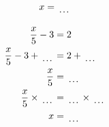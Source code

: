 \documentclass[12pt]{article}
\newcounter{minipagecount}
\begin{document}
\begin{multicols}{2}
\begin{minipage}[t]{0.45\textwidth}
\begin{align*}
        x &= \dotuline{\hspace{5mm}}\\
    \end{align*}
\end{minipage}\columnbreak
\noindent{(\theminipagecount)}\hspace{0.1mm} %
\begin{minipage}[t]{0.45\textwidth} %
    \vspace{-26pt}  %
    \raggedright %
    \begin{align*} %
        \frac{x}{5} - 3 &= 2\\
        \frac{x}{5} - 3 + \dotuline{\hspace{5mm}} &= 2 + \dotuline{\hspace{5mm}}\\
        \frac{x}{5} &= \dotuline{\hspace{5mm}}\\
        \frac{x}{5} \times\dotuline{\hspace{5mm}} &= \dotuline{\hspace{5mm}} \times\dotuline{\hspace{5mm}}\\
        x &= \dotuline{\hspace{5mm}}\\
    \end{align*}
\end{minipage} %
\noindent{(\theminipagecount)}\hspace{0.1mm} %
\begin{minipage}[t]{0.45\textwidth} %
    \vspace{-26pt}  %

\end{minipage}
\end{multicols}
\end{document}
